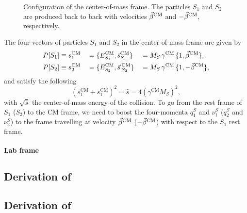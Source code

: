 \begin{figure}[htpb]
  \centering
  \caption{Configuration of the center-of-mass frame. The particles $S_1$ and $S_2$ are
produced back to back with velocities $\vec{\beta}^{\textrm{CM}}$ and $-\vec{\beta}^{\textrm{CM}}$, respectively. 
\label{fig:razor_CM_frame}}
\end{figure}

The four-vectors of particles $S_1$ and $S_2$ in the center-of-mass frame are given by
\begin{alignat}{6}
  P[S_1] &\equiv s^{\textrm{CM}}_1  &&= \{ E^{\textrm{CM}}_{S_1} , \vec{s}^{\textrm{CM}}_{S_1}\} 
&&= M_S \, \gamma^{\textrm{CM}} \, \{ 1 , \vec{\beta}^{\textrm{CM}}\} , \\ 
  P[S_2] &\equiv s^{\textrm{CM}}_2 &&= \{ E^{\textrm{CM}}_{S_2} , \vec{s}\,^{\textrm{CM}}_{S_2}\}
&&= M_S \, \gamma^{\textrm{CM}} \, \{ 1 , -\vec{\beta}^{\textrm{CM}}\}, \\ 
\end{alignat}
and satisfy the following
\begin{equation}
  (s^{\textrm{CM}}_1 + s^{\textrm{CM}}_1)^2 = \hat{s} = 4 (\gamma^{\textrm{CM}} M_S)^2,
\end{equation}
with $\sqrt{\hat{s}}$ the center-of-mass energy of the collision. 
To go from the rest frame of $S_1$ ($S_2$) to the CM frame, we need to boost the four-momenta
$q_1^S$ and $\nu_1^S$ ($q_2^S$ and $\nu_2^S$) to the frame travelling at velocity $\vec{\beta}^{\textrm{CM}}$
($-\vec{\beta}^{\textrm{CM}}$) with respect to the $S_1$ rest frame. 



\paragraph{Lab frame}


\subsection{Derivation of \mr \label{sec:razor_mr}}

\subsection{Derivation of \rsq \label{sec:razor_r2}}













